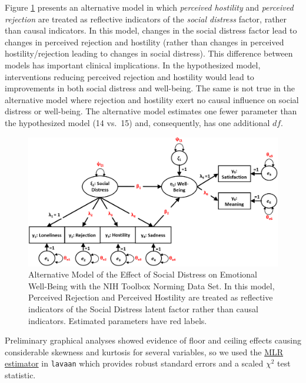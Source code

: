 \documentclass[
  english,
  man]{apa6}
\begin{document}
Figure \ref{fig:toolbox2} presents an alternative model in which \emph{perceived hostility} and \emph{perceived rejection} are treated as reflective indicators of the \emph{social distress} factor, rather than causal indicators. In this model, changes in the social distress factor lead to changes in perceived rejection and hostility (rather than changes in perceived hostility/rejection leading to changes in social distress). This difference between models has important clinical implications. In the hypothesized model, interventions reducing perceived rejection and hostility would lead to improvements in both social distress and well-being. The same is not true in the alternative model where rejection and hostility exert no causal influence on social distress or well-being. The alternative model estimates one fewer parameter than the hypothesized model (14 vs.~15) and, consequently, has one additional \(df\).

\begin{figure}

{\centering \includegraphics[width=0.9\linewidth]{toolboxDiagramAlternative} 

}

\caption{Alternative Model of the Effect of Social Distress on Emotional Well-Being with the NIH Toolbox Norming Data Set. In this model, Perceived Rejection and Perceived Hostility are treated as reflective indicators of the Social Distress latent factor rather than causal indicators. Estimated parameters have red labels.}\label{fig:toolbox2}
\end{figure}

Preliminary graphical analyses showed evidence of floor and ceiling effects causing considerable skewness and kurtosis for several variables, so we used the \href{https://lavaan.ugent.be/tutorial/est.html}{MLR estimator} in \texttt{lavaan} which provides robust standard errors and a scaled \(\chi^2\) test statistic.
\end{document}
